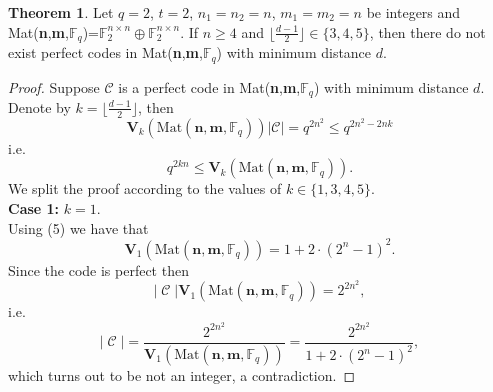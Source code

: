 \documentclass[11pt]{amsart}
\DeclareMathOperator{\C}{\mathcal{C}}
\theoremstyle{definition}
\newtheorem{theorem}{Theorem}[section]
\begin{document}
\begin{theorem}
Let $q=2$, $t=2$, $n_1=n_2=n$, $m_1=m_2=n$ be integers and Mat(\textbf{n},\textbf{m},$\mathbb{F}_q$)=$\mathbb{F}_2^{n\times n}\oplus\mathbb{F}_2^{n\times n}$. If $n \geq 4$ and $\lfloor\frac{d-1}{2}\rfloor\in\{3,4,5\}$, then there do not exist perfect codes in Mat(\textbf{n},\textbf{m},$\mathbb{F}_q$) with minimum distance $d$.
\end{theorem}
\begin{proof}
Suppose $\mathcal{C}$ is a perfect code in Mat(\textbf{n},\textbf{m},$\mathbb{F}_q$) with minimum distance $d$. Denote by $k=\lfloor \frac{d-1}2\rfloor$, then
\[
\mathbf{V}_k(\text{Mat}(\textbf{n},\textbf{m},\mathbb{F}_q))\lvert\mathcal{C}\rvert=q^{2n^2}\leq q^{2n^2-2nk}
\]
i.e.
\begin{equation}\label{condizione_caso_generale}
q^{2kn}\leq \mathbf{V}_k(\text{Mat}(\textbf{n},\textbf{m},\mathbb{F}_q)).
\end{equation}
We split the proof according to the values of $k \in\{1,3,4,5\}$.\\

\textbf{Case 1:} $k=1$.\\
Using (5) we have that
\[
\mathbf{V}_1(\text{Mat}(\textbf{n},\textbf{m},\mathbb{F}_q))=1+2\cdot(2^n-1)^2.
\]
Since the code is perfect then 
\[ |\C| \mathbf{V}_1(\text{Mat}(\textbf{n},\textbf{m},\mathbb{F}_q))=2^{2n^2},  \]
i.e. 
\[ |\C|=\frac{2^{2n^2}}{ \mathbf{V}_1(\text{Mat}(\textbf{n},\textbf{m},\mathbb{F}_q))}=\frac{2^{2n^2}}{1+2\cdot(2^n-1)^2},  \]
which turns out to be not an integer, a contradiction.


\end{proof}
\end{document}
